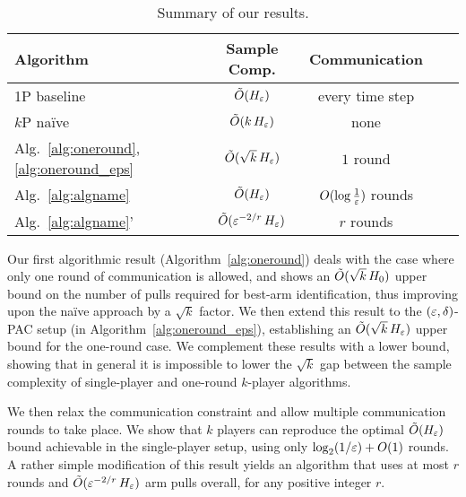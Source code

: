 \documentclass{article}
\begin{document}
\setlength{\cellspacetoplimit}{2pt}
\setlength{\cellspacebottomlimit}{2pt}

\begin{table}[htdp]
\begin{center}
\begin{tabular}{|l||Sc|Sl|}
\hline
Algorithm & Sample Comp. & Communication  \\
\hline\hline
1P baseline & $\tilde{O}(H_\varepsilon)$ & every time step \\
\hline
$k$P na\"ive & $\tilde{O}(k \, H_\varepsilon)$ & none \\
\hline
Alg.~\ref{alg:oneround},\ref{alg:oneround_eps} & $\tilde{O}(\sqrt{k} \, H_\varepsilon)$ & $1$ round \\
\hline
Alg.~\ref{alg:algname} & $\tilde{O}(H_\varepsilon)$ & $O(\log \tfrac{1}{\varepsilon})$ rounds \\
\hline
Alg.~\ref{alg:algname}' & $\tilde{O}(\varepsilon^{-2/r} \, H_\varepsilon)$ & $r$ rounds \\
\hline
\end{tabular}
\end{center}
\caption{Summary of our results.} \label{tab:results}
\end{table}

Our first algorithmic result (Algorithm~\ref{alg:oneround}) deals with the case where only one round of communication is allowed, and shows an $\tilde{O}(\sqrt{k} \, H_0)$ upper bound on the number of pulls required for best-arm identification, thus improving upon the na\"{i}ve approach by a $\sqrt{k}$ factor.
We then extend this result to the $(\varepsilon,\delta)$-PAC setup (in Algorithm~\ref{alg:oneround_eps}), establishing an $\tilde{O}(\sqrt{k} \, H_\varepsilon)$ upper bound for the one-round case.
We complement these results with a lower bound, showing that in general it is
impossible to lower the $\sqrt{k}$ gap between the sample complexity
of single-player and one-round $k$-player algorithms.


We then relax the communication constraint and allow multiple
communication rounds to take place.
We show that $k$ players can reproduce the optimal $\tilde{O}(H_\varepsilon)$ bound achievable in the single-player setup, using only $\log_2(1/\varepsilon) + O(1)$ rounds.
A rather simple modification of this result yields an algorithm that uses at most $r$ rounds and $\tilde{O}(\varepsilon^{-2/r} \, H_\varepsilon)$ arm pulls overall, for any positive integer $r$.
\end{document}
